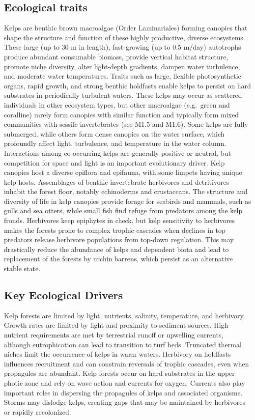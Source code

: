 \documentclass[
  letterpaper,
  DIV=11,
  numbers=noendperiod]{scrartcl}
\begin{document}
\subsection{Ecological traits}\label{ecological-traits-27}

Kelps are benthic brown macroalgae (Order Laminariales) forming canopies
that shape the structure and function of these highly productive,
diverse ecosystems. These large (up to 30 m in length), fast-growing (up
to 0.5 m/day) autotrophs produce abundant consumable biomass, provide
vertical habitat structure, promote niche diversity, alter light-depth
gradients, dampen water turbulence, and moderate water temperatures.
Traits such as large, flexible photosynthetic organs, rapid growth, and
strong benthic holdfasts enable kelps to persist on hard substrates in
periodically turbulent waters. These kelps may occur as scattered
individuals in other ecosystem types, but other macroalgae (e.g.~green
and coralline) rarely form canopies with similar function and typically
form mixed communities with sessile invertebrates (see M1.5 and M1.6).
Some kelps are fully submerged, while others form dense canopies on the
water surface, which profoundly affect light, turbulence, and
temperature in the water column. Interactions among co-occurring kelps
are generally positive or neutral, but competition for space and light
is an important evolutionary driver. Kelp canopies host a diverse
epiflora and epifauna, with some limpets having unique kelp hosts.
Assemblages of benthic invertebrate herbivores and detritivores inhabit
the forest floor, notably echinoderms and crustaceans. The structure and
diversity of life in kelp canopies provide forage for seabirds and
mammals, such as gulls and sea otters, while small fish find refuge from
predators among the kelp fronds. Herbivores keep epiphytes in check, but
kelp sensitivity to herbivores makes the forests prone to complex
trophic cascades when declines in top predators release herbivore
populations from top-down regulation. This may drastically reduce the
abundance of kelps and dependent biota and lead to replacement of the
forests by urchin barrens, which persist as an alternative stable state.

\subsection{Key Ecological Drivers}\label{key-ecological-drivers-27}

Kelp forests are limited by light, nutrients, salinity, temperature, and
herbivory. Growth rates are limited by light and proximity to sediment
sources. High nutrient requirements are met by terrestrial runoff or
upwelling currents, although eutrophication can lead to transition to
turf beds. Truncated thermal niches limit the occurrence of kelps in
warm waters. Herbivory on holdfasts influences recruitment and can
constrain reversals of trophic cascades, even when propagules are
abundant. Kelp forests occur on hard substrates in the upper photic zone
and rely on wave action and currents for oxygen. Currents also play
important roles in dispersing the propagules of kelps and associated
organisms. Storms may dislodge kelps, creating gaps that may be
maintained by herbivores or rapidly recolonized.
\end{document}
